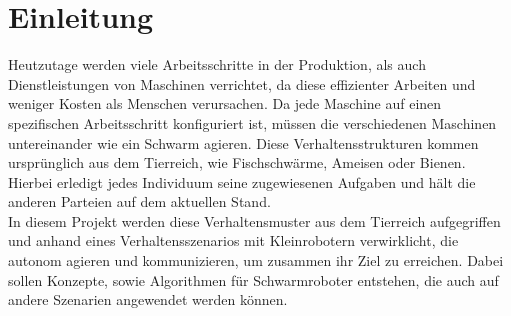 \section{Einleitung}

Heutzutage werden viele Arbeitsschritte in der Produktion, als auch Dienstleistungen von Maschinen verrichtet, da diese effizienter Arbeiten und weniger Kosten als Menschen verursachen. Da jede Maschine auf einen spezifischen Arbeitsschritt konfiguriert ist, müssen die verschiedenen Maschinen untereinander wie ein Schwarm agieren. Diese Verhaltensstrukturen kommen ursprünglich aus dem Tierreich, wie Fischschwärme, Ameisen oder Bienen. Hierbei erledigt jedes Individuum seine zugewiesenen Aufgaben und hält die anderen Parteien auf dem aktuellen Stand.\\
In diesem Projekt werden diese Verhaltensmuster aus dem Tierreich aufgegriffen und anhand eines Verhaltensszenarios mit Kleinrobotern verwirklicht, die autonom agieren und kommunizieren, um zusammen ihr Ziel zu erreichen. Dabei sollen Konzepte, sowie Algorithmen für Schwarmroboter entstehen, die auch auf andere Szenarien angewendet werden können.\\